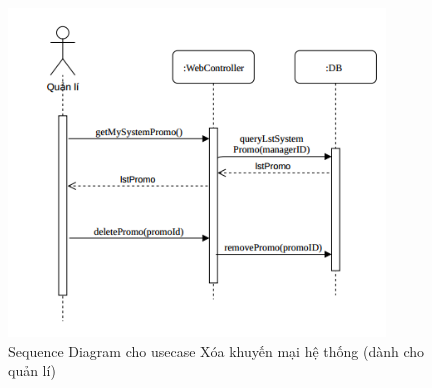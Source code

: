 \begin{figure}[!h]
	\centering
	\includegraphics[width=10cm]{Image/deleteSystemPromo.png}
	\caption{Sequence Diagram cho usecase Xóa khuyến mại hệ thống (dành cho quản lí)}
\end{figure}
